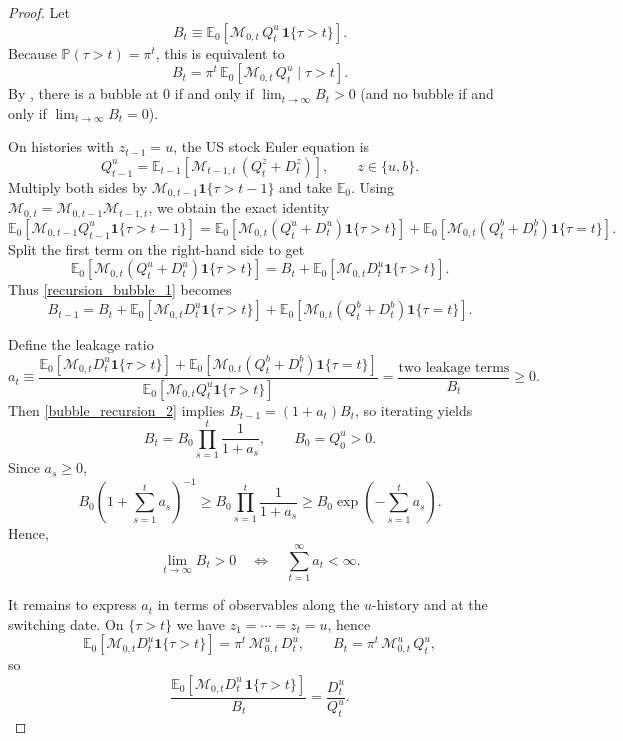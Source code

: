 \documentclass[12pt]{article}
\theoremstyle{plain}
\begin{document}
\begin{proof}
Let
\[
B_t \equiv \mathbb E_0\!\left[\mathcal M_{0,t}\,Q_t^u\,\mathbf 1\{\tau>t\}\right].
\]
Because $\mathbb P(\tau>t)=\pi^t$, this is equivalent to
\[
B_t=\pi^t\,\mathbb E_0\!\left[\mathcal M_{0,t}\,Q_t^u\mid \tau>t\right].
\]
By , there is a bubble at $0$ if and only if $\lim_{t\to\infty}B_t>0$ (and no bubble if and only if $\lim_{t\to\infty}B_t=0$).

On histories with $z_{t-1}=u$, the US stock Euler equation is
\[
Q_{t-1}^u
=\mathbb E_{t-1}\!\left[\mathcal M_{t-1,t}\,(Q_t^{z}+D_t^{z})\right],
\qquad z\in\{u,b\}.
\]
Multiply both sides by $\mathcal M_{0,t-1}\mathbf 1\{\tau>t-1\}$ and take $\mathbb E_0$. Using
$\mathcal M_{0,t}=\mathcal M_{0,t-1}\mathcal M_{t-1,t}$, we obtain the exact identity
\begin{equation}\label{recursion_bubble_1}
\mathbb E_0\!\left[\mathcal M_{0,t-1}Q_{t-1}^u\mathbf 1\{\tau>t-1\}\right]
=
\mathbb E_0\!\left[\mathcal M_{0,t}(Q_t^u+D_t^u)\mathbf 1\{\tau>t\}\right]
+
\mathbb E_0\!\left[\mathcal M_{0,t}(Q_t^b+D_t^b)\mathbf 1\{\tau=t\}\right].
\end{equation}
Split the first term on the right-hand side to get
\[
\mathbb E_0\!\left[\mathcal M_{0,t}(Q_t^u+D_t^u)\mathbf 1\{\tau>t\}\right]
=
B_t+\mathbb E_0\!\left[\mathcal M_{0,t}D_t^u\mathbf 1\{\tau>t\}\right].
\]
Thus \eqref{recursion_bubble_1} becomes
\begin{equation}\label{bubble_recursion_2}
B_{t-1}
=
B_t
+\mathbb E_0\!\left[\mathcal M_{0,t}D_t^u\mathbf 1\{\tau>t\}\right]
+\mathbb E_0\!\left[\mathcal M_{0,t}(Q_t^b+D_t^b)\mathbf 1\{\tau=t\}\right].
\end{equation}

Define the leakage ratio
\[
a_t\equiv
\frac{
\mathbb E_0\!\left[\mathcal M_{0,t}D_t^u\mathbf 1\{\tau>t\}\right]
+\mathbb E_0\!\left[\mathcal M_{0,t}(Q_t^b+D_t^b)\mathbf 1\{\tau=t\}\right]
}{
\mathbb E_0\!\left[\mathcal M_{0,t}Q_t^u\mathbf 1\{\tau>t\}\right]
}
=\frac{\text{two leakage terms}}{B_t}\ge 0.
\]
Then \eqref{bubble_recursion_2} implies $B_{t-1}=(1+a_t)B_t$, so iterating yields
\[
B_t=B_0\prod_{s=1}^t\frac{1}{1+a_s},
\qquad B_0=Q_0^u>0.
\]
Since $a_s\ge 0$,
\[
B_0\left(1+\sum_{s=1}^t a_s\right)^{-1}
\ge B_0\prod_{s=1}^t\frac{1}{1+a_s}
\ge B_0\exp\!\left(-\sum_{s=1}^t a_s\right).
\]
Hence,
\[
\lim_{t\to\infty}B_t>0
\quad\Longleftrightarrow\quad
\sum_{t=1}^\infty a_t<\infty.
\]

It remains to express $a_t$ in terms of observables along the $u$-history and at the switching date.
On $\{\tau>t\}$ we have $z_1=\cdots=z_t=u$, hence
\[
\mathbb E_0\!\left[\mathcal M_{0,t}D_t^u\mathbf 1\{\tau>t\}\right]
=\pi^t\,\mathcal M_{0,t}^u\,D_t^u,
\qquad
B_t=\pi^t\,\mathcal M_{0,t}^u\,Q_t^u,
\]
so
\[
\frac{\mathbb E_0[\mathcal M_{0,t}D_t^u\,\mathbf 1\{\tau>t\}]}{B_t}
=\frac{D_t^u}{Q_t^u}.
\]


\end{proof}
\end{document}
